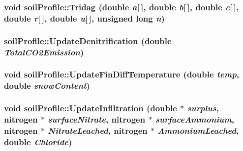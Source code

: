 \label{classsoil_profile_a63e938ce16657be6fbff5eb6a6b63791}
\hypertarget{classsoil_profile_a97afe4fe7935e3f3fa732f8fe20f6730}{
\subsubsection[{Tridag}]{\setlength{\rightskip}{0pt plus 5cm}void soilProfile::Tridag (double {\em a}\mbox{[}$\,$\mbox{]}, \/  double {\em b}\mbox{[}$\,$\mbox{]}, \/  double {\em c}\mbox{[}$\,$\mbox{]}, \/  double {\em r}\mbox{[}$\,$\mbox{]}, \/  double {\em u}\mbox{[}$\,$\mbox{]}, \/  unsigned long {\em n})}}
\label{classsoil_profile_a97afe4fe7935e3f3fa732f8fe20f6730}
\hypertarget{classsoil_profile_abd4b5dd658a93bc311fcd9a1233eaa1f}{
\subsubsection[{UpdateDenitrification}]{ soilProfile::UpdateDenitrification (double {\em TotalCO2Emission})}}
\label{classsoil_profile_abd4b5dd658a93bc311fcd9a1233eaa1f}
\hypertarget{classsoil_profile_a11708c4ea232e4ba78ba3b7cf425853c}{
\subsubsection[{UpdateFinDiffTemperature}]{\setlength{\rightskip}{0pt plus 5cm}void soilProfile::UpdateFinDiffTemperature (double {\em temp}, \/  double {\em snowContent})}}
\label{classsoil_profile_a11708c4ea232e4ba78ba3b7cf425853c}
\hypertarget{classsoil_profile_a2338366aa1f67cfeefb60ed5be15d65a}{
\subsubsection[{UpdateInfiltration}]{\setlength{\rightskip}{0pt plus 5cm}void soilProfile::UpdateInfiltration (double $\ast$ {\em surplus}, \/  {\bf nitrogen} $\ast$ {\em surfaceNitrate}, \/  {\bf nitrogen} $\ast$ {\em surfaceAmmonium}, \/  {\bf nitrogen} $\ast$ {\em NitrateLeached}, \/  {\bf nitrogen} $\ast$ {\em AmmoniumLeached}, \/  double {\em Chloride})}}
